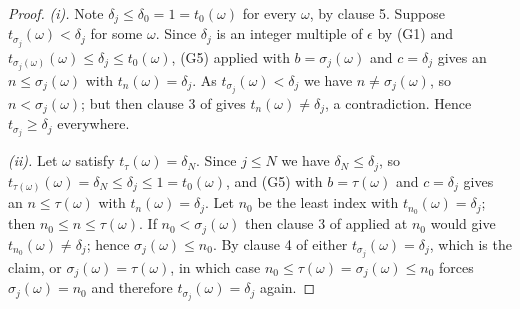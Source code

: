 \begin{proof}
\emph{(i).} Note $\delta_j\le\delta_0=1=t_0(\omega)$ for every $\omega$, by
clause 5. Suppose $t_{\sigma_j}(\omega)<\delta_j$ for some $\omega$. Since
$\delta_j$ is an integer multiple of $\epsilon$ by (G1) and
$t_{\sigma_j(\omega)}(\omega)\le\delta_j\le t_0(\omega)$, (G5) applied with
$b=\sigma_j(\omega)$ and $c=\delta_j$ gives an $n\le\sigma_j(\omega)$ with
$t_n(\omega)=\delta_j$. As $t_{\sigma_j}(\omega)<\delta_j$ we have
$n\ne\sigma_j(\omega)$, so $n<\sigma_j(\omega)$; but then clause 3 of
 gives $t_n(\omega)\ne\delta_j$, a contradiction. Hence
$t_{\sigma_j}\ge\delta_j$ everywhere.

\emph{(ii).} Let $\omega$ satisfy $t_\tau(\omega)=\delta_N$. Since $j\le N$ we
have $\delta_N\le\delta_j$, so
$t_{\tau(\omega)}(\omega)=\delta_N\le\delta_j\le1=t_0(\omega)$, and (G5) with
$b=\tau(\omega)$ and $c=\delta_j$ gives an $n\le\tau(\omega)$ with
$t_n(\omega)=\delta_j$. Let $n_0$ be the least index with
$t_{n_0}(\omega)=\delta_j$; then $n_0\le n\le\tau(\omega)$. If
$n_0<\sigma_j(\omega)$ then clause 3 of  applied at $n_0$
would give $t_{n_0}(\omega)\ne\delta_j$; hence $\sigma_j(\omega)\le n_0$. By
clause 4 of  either $t_{\sigma_j}(\omega)=\delta_j$, which
is the claim, or $\sigma_j(\omega)=\tau(\omega)$, in which case
$n_0\le\tau(\omega)=\sigma_j(\omega)\le n_0$ forces
$\sigma_j(\omega)=n_0$ and therefore $t_{\sigma_j}(\omega)=\delta_j$ again.
\end{proof}
